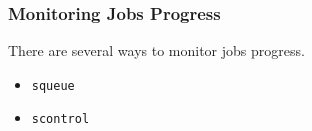 \documentclass{beamer}
\newcommand{\code}[1]{\colorbox{codegray}{\texttt{#1}}}
\begin{document}


\begin{frame}
\frametitle{Monitoring Jobs Progress}
There are several ways to monitor jobs progress.  
\bigskip
\begin{itemize}
    \item \code{squeue}
    \pause
    \bigskip
    \item \code{scontrol}
\end{itemize}
\end{frame}
\end{document}

